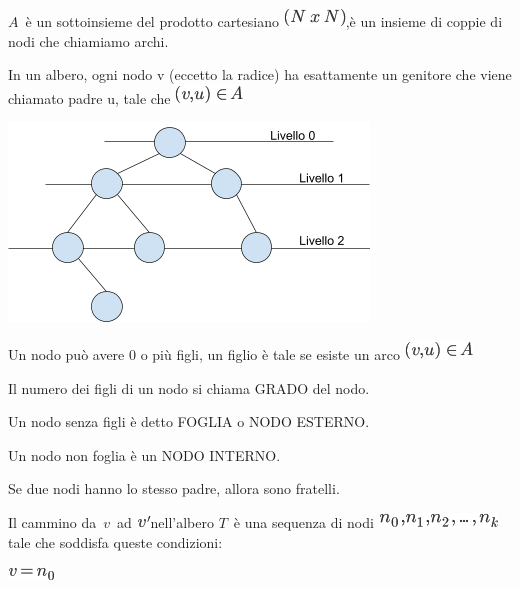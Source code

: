 \documentclass{article}
\begin{document}
$A${~è un sottoinsieme del prodotto
cartesiano }\includegraphics{images/image74.png}{,è un insieme di coppie
di nodi che chiamiamo }{archi}{.}

{}

{}

{In un albero, ogni nodo v (eccetto la radice) ha esattamente un
genitore che viene chiamato padre u, tale che
}\includegraphics{images/image75.png}

{\includegraphics{images/image539.png}}

{}

{Un nodo può avere 0 o più figli, un figlio è tale se esiste un arco
}\includegraphics{images/image75.png}

{}

{Il numero dei figli di un nodo si chiama GRADO del nodo.}

{Un nodo senza figli è detto FOGLIA o NODO ESTERNO.}

{Un nodo non foglia è un NODO INTERNO.}

{Se due nodi hanno lo stesso padre, allora sono fratelli.}

{}

{Il cammino da}{~}$v${~ad
}\includegraphics{images/image77.png}{nell'albero
}$T${~è una sequenza di nodi
}\includegraphics{images/image78.png}{tale che soddisfa queste
condizioni:}

\includegraphics{images/image79.png}
\end{document}
